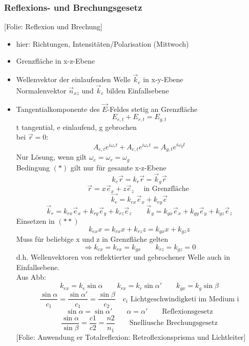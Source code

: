 \documentclass[titlepage,12pt,a4paper,ngerman]{report}
\newcommand{\tx}[1]{\textrm{#1}}
\newcommand{\folie}[1]{\color{gray}[Folie: #1]\color{black}}
\begin{document}
\subsubsection{Reflexions- und Brechungsgesetz}
\folie{Reflexion und Brechung}
\begin{itemize}
	\item hier: Richtungen, Intensitäten/Polarisation (Mittwoch)
	\item Grenzfläche in x-z-Ebene
	\item Wellenvektor der einlaufenden Welle $ \vec{k}_e $ in x-y-Ebene\\
	Normalenvektor $ \vec{n}_{xz} $ und $ \vec{k}_e $ bilden Einfallsebene
	\item Tangentialkomponente des $ \vec{E} $-Feldes stetig an Grenzfläche
	\begin{equation*}
	E_{e,t} + E_{r,t} = E_{g,t} \tag{$ * $}
	\end{equation*}
	t tangential, e einlaufend, g gebrochen\\
	bei $ \vec{r} = 0 :$
	$$A_{e,t} e^{i \omega_e t} + A_{e,t} e^{i \omega_r t} = A_{g,t} e^{i \omega_g t} $$
	Nur Lösung, wenn gilt $ \omega_e = \omega_r = \omega_g $\\
	Bedingung $ (*) $ gilt nur für gesamte x-z-Ebene
	\begin{equation*}
	k_e \vec{r} = k_r \vec{r} = \vec{k}_g \vec{r} \tag{ $ **  $}
	\end{equation*}
	$$\vec{r} = x \vec{e}_x + z \vec{e}_z \quad \tx{ in Grenzfläche }$$
	$$\vec{k_e} = k_{ex} \vec{e}_x + k_{ey} \vec{e}$$
	$$\vec{k}_r = k_{rx} \vec{e}_x + k_{ry} \vec{e}_y + k_{rz} \vec{e}_z \qquad \vec{k}_g = k_{gx} \vec{e}_x + k_{gy} \vec{e}_y + k_{gz} \vec{e}_z$$
	Einsetzen in $ (**) $
	$$k_{ex} x = k_{rx} x + k_{rz} z = k_{gx} x + k_{gz} z $$
	Muss für beliebige x und z in Grenzfläche gelten
	$$\Rightarrow k_{ex} = k_{rx} = k_{gx} \qquad k_{rz} = k_{gz} = 0$$
	d.h. Wellenvektoren von reflektierter und gebrochener Welle auch in Einfallsebene.\\
	Aus Abb: 
	$$k_{ex} = k_e \sin \alpha \qquad k_{rx} = k_r \sin \alpha' \qquad k_{gx} = k_g \sin \beta $$
	$$\frac{\sin \alpha}{c_1} = \frac{\sin \alpha'}{c_1} = \frac{\sin \beta}{c_2} \quad c_i \tx{ Lichtgeschwindigketi im Medium i}$$
	$$\boxed{ \sin \alpha = \sin \alpha' \qquad \alpha = \alpha' \qquad \tx{Reflexionsgesetz}}$$
	$$\boxed{ \frac{\sin \alpha}{\sin \beta} = \frac{c1}{c2} = \frac{n2}{n_1} \qquad \tx{Snelliusche Brechungsgesetz} }$$
	\folie{Anwendung er Totalreflexion: Retroflexionsprisma und Lichtleiter}
	
	
\end{itemize} 
\end{document}
